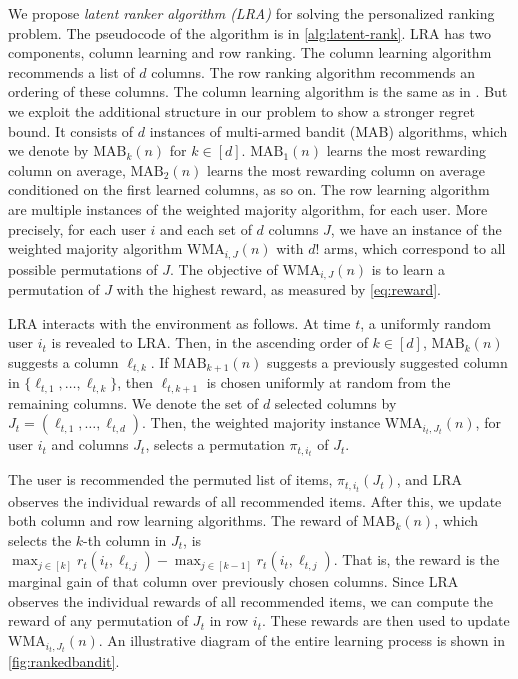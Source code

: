 
We propose \emph{latent ranker algorithm (LRA)} for solving the personalized ranking problem. The pseudocode of the algorithm is in \cref{alg:latent-rank}. LRA has two components, column learning and row ranking. The column learning algorithm recommends a list of $d$ columns. The row ranking algorithm recommends an ordering of these columns. The column learning algorithm is the same as in  \citet{radlinski2008learning}. But we exploit the additional structure in our problem to show a stronger regret bound. It consists of $d$ instances of multi-armed bandit (MAB) algorithms, which we denote by $\textrm{MAB}_k(n)$ for $k \in [d]$. $\textrm{MAB}_1(n)$ learns the most rewarding column on average, $\textrm{MAB}_2(n)$ learns the most rewarding column on average conditioned on the first learned columns, as so on. The row learning algorithm are multiple instances of the weighted majority algorithm, for each user. More precisely, for each user $i$ and each set of $d$ columns $J$, we have an instance of the weighted majority algorithm $\textrm{WMA}_{i, J}(n)$ with $d!$ arms, which correspond to all possible permutations of $J$. The objective of $\textrm{WMA}_{i, J}(n)$ is to learn a permutation of $J$ with the highest reward, as measured by \eqref{eq:reward}.

LRA interacts with the environment as follows. At time $t$, a uniformly random user $i_t$ is revealed to LRA. Then, in the ascending order of $k \in [d]$, $\textrm{MAB}_k(n)$ suggests a column $\ell_{t, k}$. If $\textrm{MAB}_{k + 1}(n)$ suggests a previously suggested column in $\{\ell_{t, 1}, \dots, \ell_{t, k}\}$, then $\ell_{t, k + 1}$ is chosen uniformly at random from the remaining columns. We denote the set of $d$ selected columns by $J_t = (\ell_{t, 1}, \dots, \ell_{t, d})$. Then, the weighted majority instance $\textrm{WMA}_{i_t, J_t}(n)$, for user $i_t$ and columns $J_t$, selects a permutation $\pi_{t, i_t}$ of $J_t$.

The user is recommended the permuted list of items, $\pi_{t, i_t}(J_t)$, and LRA observes the individual rewards of all recommended items. After this, we update both column and row learning algorithms. The reward of $\textrm{MAB}_k(n)$, which selects the $k$-th column in $J_t$, is $\max_{j \in [k]} r_t(i_t, \ell_{t, j}) - \max_{j \in [k - 1]} r_t(i_t, \ell_{t, j})$. That is, the reward is the marginal gain of that column over previously chosen columns. Since LRA observes the individual rewards of all recommended items, we can compute the reward of any permutation of $J_t$ in row $i_t$. These rewards are then used to update $\textrm{WMA}_{i_t, J_t}(n)$. An illustrative diagram of the entire learning process is shown in \cref{fig:rankedbandit}.

